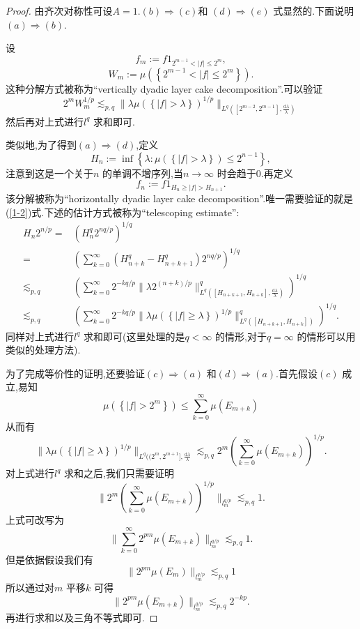 \begin{proof}
 由齐次对称性可设$A=1$.$(b)\Rightarrow (c)$和 $(d)\Rightarrow (e)$ 式显然的.下面说明$(a)\Rightarrow(b)$.

 设
 \[
 f_m:=f 1_{2^{m-1}<|f|\le 2^{m}},
 \] 
  \[
    W_m:=\mu\left( \left\{ 2^{m-1}<|f|\le 2^{m} \right\}  \right) .
  \]
  这种分解方式被称为``vertically dyadic layer cake decomposition''.可以验证
  \[
    2^{m}W_m^{1 /p}\lesssim_{p,q} \|\lambda \mu\left( \left\{ |f|>\lambda \right\}  \right) ^{1 /p}\|_{L^{q}\left( [2^{m-2},2^{m-1}], \frac{\mathrm{d}\lambda}{\lambda} \right) }
  \]
  然后再对上式进行$l^{q}$ 求和即可.

  类似地,为了得到$(a)\Rightarrow (d)$,定义
  \[
    H_n:=\inf \left\{ \lambda:\mu\left( \left\{ |f|>\lambda \right\}  \right) \le 2^{n-1} \right\} ,
  \] 
  注意到这是一个关于$n$ 的单调不增序列,当$n\to \infty$ 时会趋于$0$.再定义
  \[
  f_n:=f 1_{H_n\ge |f|>H_{n+1}}.
  \] 
  该分解被称为``horizontally dyadic layer cake decomposition''.唯一需要验证的就是(\ref{1-2})式.下述的估计方式被称为``telescoping estimate'':
  \begin{equation*}
    \begin{aligned}
      H_n 2^{n /p} = & (H_n^{q}2^{nq /p})^{1 /q}\\
      = & \left( \sum_{k=0}^{\infty} \left( H^{q}_{n+k}-H^{q}_{n+k+1} \right) 2^{ nq /p} \right)^{1 /q}\\
      \lesssim_{p,q} & \left( \sum_{k=0}^{\infty} 2^{-kq /p}\|\lambda 2^{(n+k) /p}\|^{q}_{L^{q}([H_{n+k+1},H_{n+k}], \frac{\mathrm{d}\lambda}{\lambda})} \right)^{1 /q}\\
      \lesssim_{p,q} & \left( \sum_{k=0}^{\infty} 2^{-kq /p}\|\lambda \mu\left( \left\{ |f|\ge \lambda \right\}  \right) ^{1 /p}\|^{q}_{L^{q}([H_{n+k+1},H_{n+k}])} \right) ^{1 /q}.
    \end{aligned}
  \end{equation*}
  同样对上式进行$l^{q}$ 求和即可(这里处理的是$q<\infty$ 的情形,对于$q=\infty$ 的情形可以用类似的处理方法).

  为了完成等价性的证明,还要验证$(c)\Rightarrow (a)$ 和$(d)\Rightarrow (a)$.首先假设$(c)$ 成立,易知
  \[
    \mu\left( \left\{ |f|>2^{m} \right\}  \right) \le \sum_{k=0}^{\infty} \mu\left( E_{m+k} \right) 
  \] 从而有
  \[
    \|\lambda \mu \left( \left\{ |f|\ge \lambda \right\}  \right) ^{1 /p}\|_{L^{q}((2^{m},2^{m+1}], \frac{\mathrm{d}\lambda}{\lambda}}\lesssim_{p,q} 2^{m}\left( \sum_{k=0}^{\infty} \mu\left( E_{m+k} \right)  \right) ^{1 /p}.
  \] 
  对上式进行$l^{q}$ 求和之后,我们只需要证明
  \[
    \|2^{m}\left( \sum_{k=0}^{\infty} \mu\left( E_{m+k} \right)  \right) ^{1 /p}\|_{l^{q /p}_m}\lesssim_{p,q}1.
  \] 
  上式可改写为
  \[
    \|\sum_{k=0}^{\infty} 2^{pm}\mu\left( E_{m+k}  \right) \|_{l^{q /p}_m}\lesssim_{p,q}1.
  \]
  但是依据假设我们有
  \[
    \|2^{pm}\mu\left( E_m \right) \|_{l^{q /p}_m}\lesssim_{p,q}1
  \] 
  所以通过对$m$ 平移$k$ 可得
  \[
    \|2^{pm}\mu\left( E_{m+k} \right) \|_{l^{q /p}_{m}}\lesssim_{p,q}2^{-kp}.
  \] 
  再进行求和以及三角不等式即可.


\end{proof}
